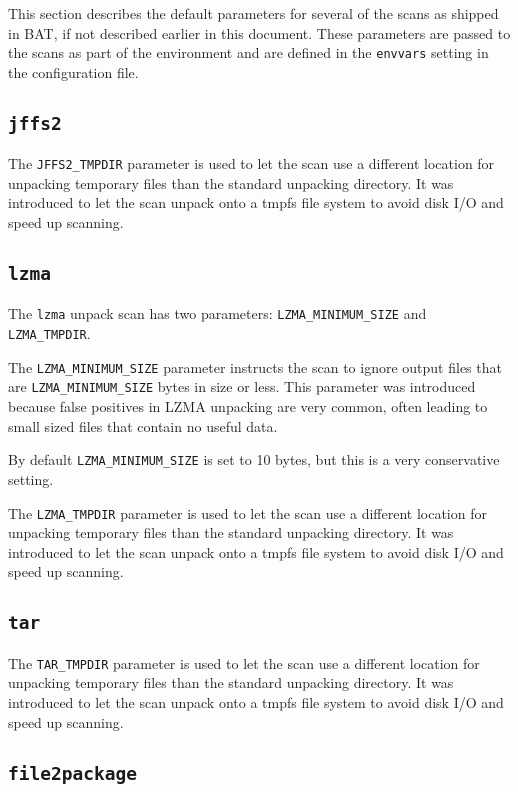 \documentclass[10pt]{article}
\begin{document}
This section describes the default parameters for several of the scans as
shipped in BAT, if not described earlier in this document. These parameters are
passed to the scans as part of the environment and are defined in the
\texttt{envvars} setting in the configuration file.

\subsection{\texttt{jffs2}}

The \texttt{JFFS2\_TMPDIR} parameter is used to let the scan use a different
location for unpacking temporary files than the standard unpacking directory.
It was introduced to let the scan unpack onto a tmpfs file system to avoid disk
I/O and speed up scanning.

\subsection{\texttt{lzma}}

The \texttt{lzma} unpack scan has two parameters: \texttt{LZMA\_MINIMUM\_SIZE}
and \texttt{LZMA\_TMPDIR}.

The \texttt{LZMA\_MINIMUM\_SIZE} parameter instructs the scan to ignore output
files that are \texttt{LZMA\_MINIMUM\_SIZE} bytes in size or less. This
parameter was introduced because false positives in LZMA unpacking are very
common, often leading to small sized files that contain no useful data.

By default \texttt{LZMA\_MINIMUM\_SIZE} is set to 10 bytes, but this is a very
conservative setting.

The \texttt{LZMA\_TMPDIR} parameter is used to let the scan use a different
location for unpacking temporary files than the standard unpacking directory.
It was introduced to let the scan unpack onto a tmpfs file system to avoid disk
I/O and speed up scanning.

\subsection{\texttt{tar}}

The \texttt{TAR\_TMPDIR} parameter is used to let the scan use a different
location for unpacking temporary files than the standard unpacking directory.
It was introduced to let the scan unpack onto a tmpfs file system to avoid disk
I/O and speed up scanning.

\subsection{\texttt{file2package}}
\end{document}

